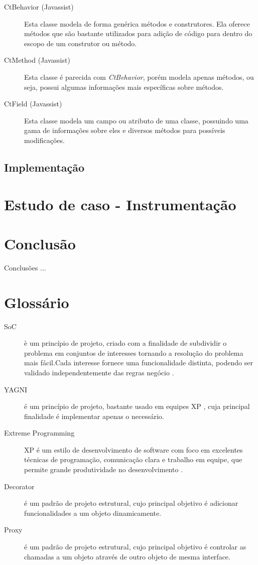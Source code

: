 \documentclass[tc,openright]{iiufrgs}
\begin{document}
\begin{description}
\item [CtBehavior (Javassist)] Esta classe modela de forma genérica métodos e construtores. Ela oferece métodos que são bastante utilizados para adição de código para dentro do escopo de um construtor ou método.
\item [CtMethod (Javassist)] Esta classe é parecida com \textit{CtBehavior}, porém modela apenas métodos, ou seja, possui algumas informações mais específicas sobre métodos.
\item [CtField (Javassist)] Esta classe modela um campo ou atributo de uma classe, possuindo uma gama de informações sobre eles e diversos métodos para possíveis modificações.
\end{description}

\section{Implementação}

\chapter{Estudo de caso - Instrumentação}

\chapter{Conclusão}

Conclusões ...

\singlespacing



\chapter*{Glossário}

\begin{description}
	\item[SoC] è um princípio de projeto, criado com a finalidade de subdividir o problema em conjuntos de interesses tornando a resolução do problema mais fácil.Cada interesse fornece uma funcionalidade distinta, podendo ser validado independentemente das regras negócio \cite{pressman2010engineering}.
	\item [YAGNI] é um princípio de projeto, bastante usado em equipes XP , cuja principal finalidade é implementar apenas o necessário.
	\item[Extreme Programming] XP é um estilo de desenvolvimento de software com foco em excelentes técnicas de programação, comunicação clara e trabalho em equipe, que permite grande produtividade no desenvolvimento \cite{beck2004extreme}.
\item [Decorator] é um padrão de projeto estrutural, cujo principal objetivo é adicionar funcionalidades a um objeto dinamicamente.
\item [Proxy] é um padrão de projeto estrutural, cujo principal objetivo é controlar as chamadas a um objeto através de outro objeto de mesma interface.
\end{description}

\appendix
\end{document}
